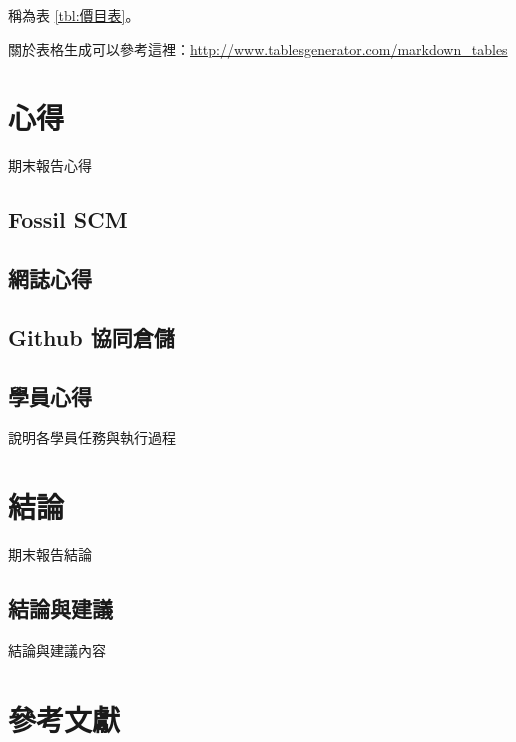 \documentclass[12pt,,]{report}
\begin{document}
稱為表 \ref{tbl:價目表}。

關於表格生成可以參考這裡：\url{http://www.tablesgenerator.com/markdown_tables}

\hypertarget{ux5fc3ux5f97}{%
\chapter{心得}\label{ux5fc3ux5f97}}

期末報告心得

\hypertarget{fossil-scm}{%
\section{Fossil SCM}\label{fossil-scm}}

\hypertarget{ux7db2ux8a8cux5fc3ux5f97}{%
\section{網誌心得}\label{ux7db2ux8a8cux5fc3ux5f97}}

\hypertarget{github-ux5354ux540cux5009ux5132}{%
\section{Github 協同倉儲}\label{github-ux5354ux540cux5009ux5132}}

\hypertarget{ux5b78ux54e1ux5fc3ux5f97}{%
\section{學員心得}\label{ux5b78ux54e1ux5fc3ux5f97}}

說明各學員任務與執行過程

\hypertarget{ux7d50ux8ad6}{%
\chapter{結論}\label{ux7d50ux8ad6}}

期末報告結論

\hypertarget{ux7d50ux8ad6ux8207ux5efaux8b70}{%
\section{結論與建議}\label{ux7d50ux8ad6ux8207ux5efaux8b70}}

結論與建議內容

\hypertarget{ux53c3ux8003ux6587ux737b}{%
\chapter{參考文獻}\label{ux53c3ux8003ux6587ux737b}}
\end{document}
